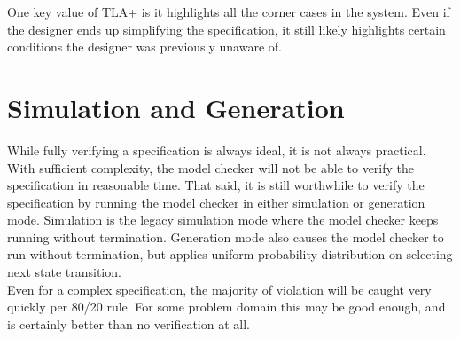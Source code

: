 One key value of TLA+ is it highlights all the corner cases in the system. Even
if the designer ends up simplifying the specification, it still likely highlights certain
conditions the designer was previously unaware of.\\


\section{Simulation and Generation}

While fully verifying a specification is always ideal, it is not always
practical. With sufficient complexity, the model checker will not be able to 
verify the specification in reasonable time. That said, it is still worthwhile 
to verify the specification by running the model checker in either simulation or
generation mode. Simulation is the legacy simulation mode where the model
checker keeps running without termination. Generation mode also causes the model
checker to run without termination, but applies uniform probability distribution
on selecting next state transition.\\

Even for a complex specification, the majority of violation will be caught very
quickly per 80/20 rule. For some problem domain this may be good enough, and is
certainly better than no verification at all. 
